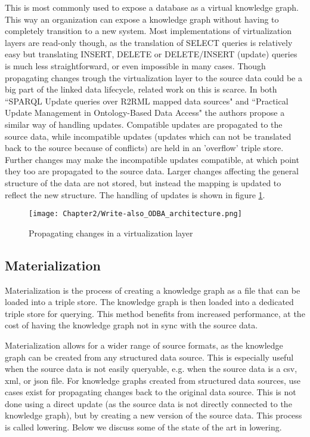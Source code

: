 This is most commonly used to expose a database as a virtual knowledge graph. This way an organization can expose a knowledge graph without having to completely transition to a new system. Most implementations of virtualization layers are read-only though, as the translation of SELECT queries is relatively easy but translating INSERT, DELETE or DELETE/INSERT (update) queries is much less straightforward, or even impossible in many cases. Though propagating changes trough the virtualization layer to the source data could be a big part of the linked data lifecycle, related work on this is scarce. In both ``SPARQL Update queries over R2RML mapped data sources" \citep{unbehauen-k-2017--sparqlUpdate} and ``Practical Update Management in Ontology-Based Data Access" \citep{practical_update_management_in_ontology_based_data_access} the authors propose a similar way of handling updates. Compatible updates are propagated to the source data, while incompatible updates (updates which can not be translated back to the source because of conflicts) are held in an 'overflow' triple store. Further changes may make the incompatible updates compatible, at which point they too are propagated to the source data. Larger changes affecting the general structure of the data are not stored, but instead the mapping is updated to reflect the new structure. The handling of updates is shown in figure \ref{fig:virtualization_update}.

\begin{figure}
    \centering
    \texttt{[image: Chapter2/Write-also\_ODBA\_architecture.png]}
    \caption{Propagating changes in a virtualization layer \citep{unbehauen-k-2017--sparqlUpdate} }
    \label{fig:virtualization_update}
\end{figure}

\subsection{Materialization}
Materialization is the process of creating a knowledge graph as a file that can be loaded into a triple store. The knowledge graph is then loaded into a dedicated triple store for querying. This method benefits from increased performance, at the cost of having the knowledge graph not in sync with the source data.

Materialization allows for a wider range of source formats, as the knowledge graph can be created from any structured data source. This is especially useful when the source data is not easily queryable, e.g. when the source data is a \acrshort{csv}, \acrshort{xml}, or \acrshort{json} file. For knowledge graphs created from structured data sources, use cases exist for propagating changes back to the original data source. This is not done using a direct update (as the source data is not directly connected to the knowledge graph), but by creating a new version of the source data. This process is called lowering. Below we discuss some of the state of the art in lowering.

